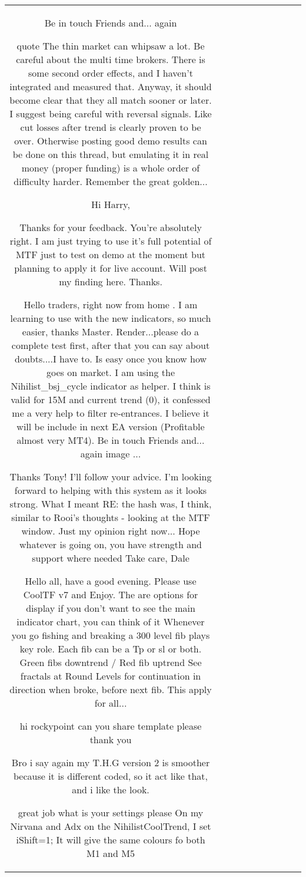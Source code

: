 \begin{table}[h!]
\begin{tabular}{|c|c|c|c|c|c|c|c|c|c|}
Be in touch Friends and... again

{quote} The thin market can whipsaw a lot. Be careful about the multi time brokers. There is some second order effects, and I haven't integrated and measured that. Anyway, it should become clear that they all match sooner or later. I suggest being careful with reversal signals. Like cut losses after trend is clearly proven to be over. Otherwise posting good demo results can be done on this thread, but emulating it in real money (proper funding) is a whole order of difficulty harder. Remember the great golden...

Hi Harry,

Thanks for your feedback. You're absolutely right. I am just trying to use it's full potential of MTF just to test on demo at the moment but planning to apply it for live account. Will post my finding here. Thanks.

Hello traders, right now from home .  I am learning to use with the new indicators, so much easier, thanks Master. Render...please do a complete test first, after that you can say about doubts....I have to. Is easy once you know how goes on market. I am using the Nihilist_bsj_cycle indicator as helper. I think is valid for 15M and current trend (0), it confessed me a very help to filter re-entrances. I believe it will be include in next EA version (Profitable almost very MT4). Be in touch Friends and... again {image} ...

Thanks Tony! I'll follow your advice. I'm looking forward to helping with this system as it looks strong. What I meant RE: the hash was, I think, similar to Rooi's thoughts - looking at the MTF window. Just my opinion right now...
Hope whatever is going on, you have strength and support where needed
Take care,
Dale

Hello all, have a good evening. Please use CoolTF v7 and Enjoy. The are options for display if you don't want to see the main indicator chart, you can think of it Whenever you go fishing and breaking a 300 level fib plays key role. Each fib can be a Tp or sl or both. Green fibs downtrend / Red fib uptrend See fractals at Round Levels for continuation in direction when broke, before next fib. This apply for all...

hi rockypoint can you share template please thank you

Bro i say again my T.H.G version 2 is smoother because it is different coded, so it act like that, and i like the look.

great job what is your settings please
On my Nirvana and Adx on the NihilistCoolTrend, I set iShift=1;
It will give the same colours fo both M1 and M5


\end{tabular}
\end{table}
